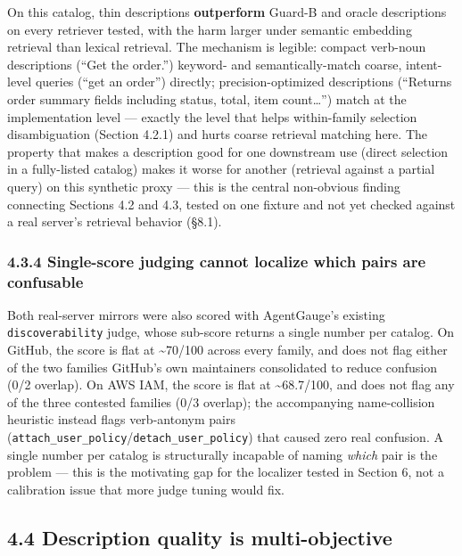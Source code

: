 On this catalog, thin descriptions \textbf{outperform} Guard-B and
oracle descriptions on every retriever tested, with the harm larger
under semantic embedding retrieval than lexical retrieval. The mechanism
is legible: compact verb-noun descriptions (``Get the order.'') keyword-
and semantically-match coarse, intent-level queries (``get an order'')
directly; precision-optimized descriptions (``Returns order summary
fields including status, total, item count\ldots{}'') match at the
implementation level --- exactly the level that helps within-family
selection disambiguation (Section 4.2.1) and hurts coarse retrieval
matching here. The property that makes a description good for one
downstream use (direct selection in a fully-listed catalog) makes it
worse for another (retrieval against a partial query) on this synthetic
proxy --- this is the central non-obvious finding connecting Sections
4.2 and 4.3, tested on one fixture and not yet checked against a real
server's retrieval behavior (§8.1).

\hypertarget{single-score-judging-cannot-localize-which-pairs-are-confusable}{%
\subsubsection{4.3.4 Single-score judging cannot localize which pairs
are
confusable}\label{single-score-judging-cannot-localize-which-pairs-are-confusable}}

Both real-server mirrors were also scored with AgentGauge's existing
\texttt{discoverability} judge, whose sub-score returns a single number
per catalog. On GitHub, the score is flat at \textasciitilde70/100
across every family, and does not flag either of the two families
GitHub's own maintainers consolidated to reduce confusion (0/2 overlap).
On AWS IAM, the score is flat at \textasciitilde68.7/100, and does not
flag any of the three contested families (0/3 overlap); the accompanying
name-collision heuristic instead flags verb-antonym pairs
(\texttt{attach\_user\_policy}/\texttt{detach\_user\_policy}) that
caused zero real confusion. A single number per catalog is structurally
incapable of naming \emph{which} pair is the problem --- this is the
motivating gap for the localizer tested in Section 6, not a calibration
issue that more judge tuning would fix.

\hypertarget{description-quality-is-multi-objective}{%
\subsection{4.4 Description quality is
multi-objective}\label{description-quality-is-multi-objective}}


